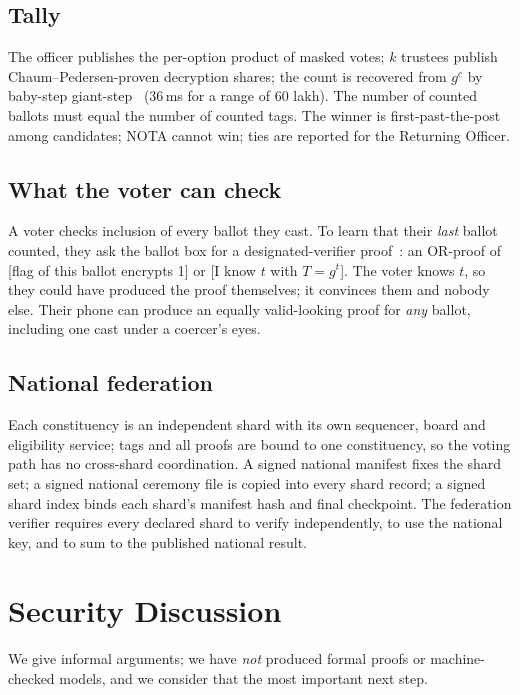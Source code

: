 \documentclass[runningheads]{llncs}
\begin{document}
\subsection{Tally}
The officer publishes the per-option product of masked votes; $k$ trustees publish Chaum--Pedersen-proven decryption shares; the count is recovered from $g^{c}$ by baby-step giant-step~\cite{shanks1971} (36\,ms for a range of 60 lakh). The number of counted ballots must equal the number of counted tags. The winner is first-past-the-post among candidates; NOTA cannot win; ties are reported for the Returning Officer.

\subsection{What the voter can check}
A voter checks inclusion of every ballot they cast. To learn that their \emph{last} ballot counted, they ask the ballot box for a designated-verifier proof~\cite{jsi1996}: an OR-proof of [flag of this ballot encrypts 1] or [I know $t$ with $T=g^t$]. The voter knows $t$, so they could have produced the proof themselves; it convinces them and nobody else. Their phone can produce an equally valid-looking proof for \emph{any} ballot, including one cast under a coercer's eyes.

\subsection{National federation}
Each constituency is an independent shard with its own sequencer, board and eligibility service; tags and all proofs are bound to one constituency, so the voting path has no cross-shard coordination. A signed national manifest fixes the shard set; a signed national ceremony file is copied into every shard record; a signed shard index binds each shard's manifest hash and final checkpoint. The federation verifier requires every declared shard to verify independently, to use the national key, and to sum to the published national result.

\section{Security Discussion}\label{sec:security}

We give informal arguments; we have \emph{not} produced formal proofs or machine-checked models, and we consider that the most important next step.
\end{document}
